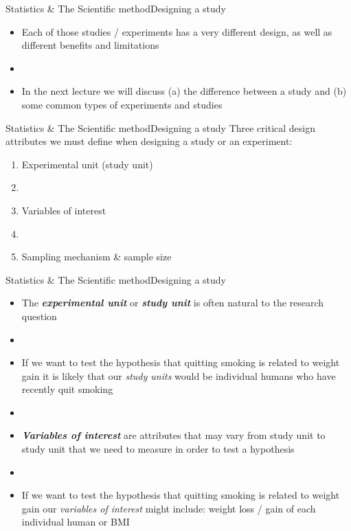 \documentclass[xcolor=dvipsnames]{beamer}
\begin{document}
\begin{frame}{Statistics \& The Scientific method}{Designing a study}
	\vspace{-12pt}
	\begin{itemize}
		\item Each of those studies / experiments has a very different design, as well as different benefits and limitations  \pause
		\item[] 
		\item In the next lecture we will discuss (a) the difference between a study and (b) some common types of experiments and studies
	\end{itemize}
\end{frame}

\begin{frame}{Statistics \& The Scientific method}{Designing a study}
	\vspace{-12pt}
	Three critical design attributes we must define when designing a study or an experiment: \pause
	\begin{enumerate}
		\item Experimental unit (study unit) \pause
		\item[]
		\item Variables of interest \pause
		\item[]
		\item Sampling mechanism \& sample size
	\end{enumerate}
\end{frame}

\begin{frame}{Statistics \& The Scientific method}{Designing a study}
	\vspace{-12pt}
	\begin{itemize}
		\item The \textbf{\emph{experimental unit}} or \textbf{\emph{study unit}} is often natural to the research question \pause
		\item[]
		\item If we want to test the hypothesis that quitting smoking is related to weight gain it is likely that our \emph{study units} would be individual humans who have recently quit smoking \pause
		\item[]
		\item \textbf{\emph{Variables of interest}} are attributes that may vary from study unit to study unit that we need to measure in order to test a hypothesis \pause
		\item[]
		\item If we want to test the hypothesis that quitting smoking is related to weight gain our \emph{variables of interest} might include: weight loss / gain of each individual human or BMI
	\end{itemize}
\end{frame}
\end{document}

